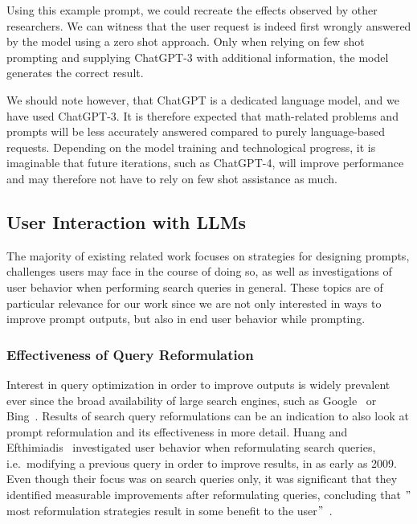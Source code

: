 
Using this example prompt, we could recreate the effects observed by other researchers.
We can witness that the user request is indeed first wrongly answered by the model
using a zero shot approach.
Only when relying on few shot prompting and supplying ChatGPT-3 with additional information,
the model generates the correct result.

We should note however, that ChatGPT is a dedicated language model, and we have used ChatGPT-3.
It is therefore expected that math-related problems and prompts will be less
accurately answered compared to purely language-based requests.
Depending on the model training and technological progress, it is imaginable that future
iterations, such as ChatGPT-4, will improve performance and may therefore not have to
rely on few shot assistance as much.


\subsection{User Interaction with LLMs}
\label{subsec:user-interaction-with-llms}
The majority of existing related work focuses on strategies for designing prompts,
challenges users may face in the course of doing so, as well as investigations of user behavior when
performing search queries in general.
These topics are of particular relevance for our work since we are not only interested in ways to
improve prompt outputs, but also in end user behavior while prompting.

\subsubsection{Effectiveness of Query Reformulation}
Interest in query optimization in order to improve outputs is widely prevalent ever since the broad
availability of large search engines, such as Google~\cite{google_google_2023} or Bing~\cite{microsoft_bing_2023}.
Results of search query reformulations can be an indication to also look at prompt reformulation
and its effectiveness in more detail.
Huang and Efthimiadis~\cite{huang_analyzing_2009} investigated user behavior when reformulating search
queries, i.e.\ modifying a previous query in order to improve results, in as early as 2009.
Even though their focus was on search queries only, it was significant that they identified
measurable improvements after reformulating queries, concluding that
\("\)most reformulation strategies result in some benefit to the user\("\)~\cite[p. 1]{huang_analyzing_2009}.


